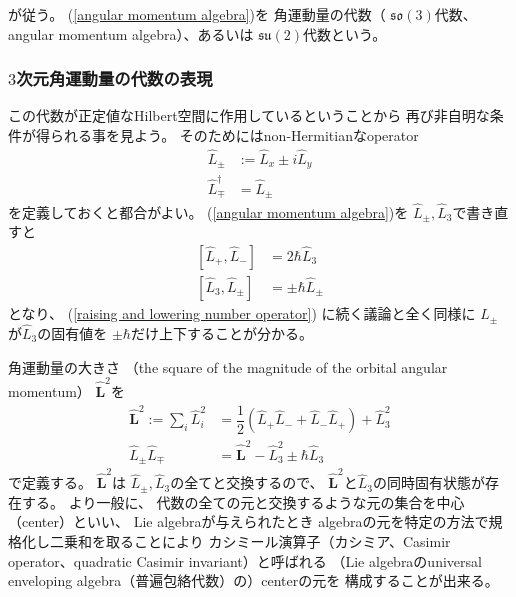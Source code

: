が従う。
(\ref{angular momentum algebra})を
角運動量の代数（
$\mathfrak{so}(3)$代数、
angular momentum algebra）、あるいは
$\mathfrak{su}(2)$代数という。

\subsubsection{$3$次元角運動量の代数の表現}

この代数が正定値なHilbert空間に作用しているということから
再び非自明な条件が得られる事を見よう。
そのためにはnon-Hermitianなoperator
\begin{align}
    \hat{L}_\pm
    &:=
    \hat{L}_x
    \pm
    i \hat{L}_y
\\
    \hat{L}_\mp^\dagger
    &=
    \hat{L}_\pm
\end{align}
を定義しておくと都合がよい。
(\ref{angular momentum algebra})を
$\hat{L}_\pm, \hat{L}_3$で書き直すと
\begin{subequations}
\begin{align}
    [\hat{L}_+, \hat{L}_-]
    &= 2 \hbar \hat{L}_3
\\
    [\hat{L}_3, \hat{L}_\pm]
    &= \pm \hbar \hat{L}_\pm
\label{angular momentum creation annihilation}
\end{align}
\label{angular momentum algebra with L_pm}
\end{subequations}
となり、
(\ref{raising and lowering number operator})
に続く議論と全く同様に
$\hat{L}_\pm$が$\hat{L}_3$の固有値を
$\pm \hbar$だけ上下することが分かる。

角運動量の大きさ
（the square of the magnitude of the orbital angular momentum）
$\hat{\bm{L}}^2$を
\begin{align}
    \hat{\bm{L}}^2
    := \sum_i \hat{L}_i^2
&=
    \dfrac{1}{2}
    \left(
        \hat{L}_+ \hat{L}_-
    +
        \hat{L}_- \hat{L}_+
    \right)
    +
    \hat{L}_3^2
\label{the square of the magnitude of the orbital angular momentum}
\\
    \hat{L}_\pm \hat{L}_\mp
    &=
    \hat{\bm{L}}^2 - \hat{L}_3^2
    \pm \hbar \hat{L}_3
\label{angular momentum raising lowering into l^2 and l_3}
\end{align}
で定義する。
$\hat{\bm{L}}^2$は
$\hat{L}_\pm, \hat{L}_3$の全てと交換するので、
$\hat{\bm{L}}^2$と$\hat{L}_3$の同時固有状態が存在する。
より一般に、
代数の全ての元と交換するような元の集合を中心（center）といい、
Lie algebraが与えられたとき
algebraの元を特定の方法で規格化し二乗和を取ることにより
カシミール演算子（カシミア、Casimir operator、quadratic Casimir invariant）と呼ばれる
（Lie algebraのuniversal enveloping algebra（普遍包絡代数）の）centerの元を
構成することが出来る。

